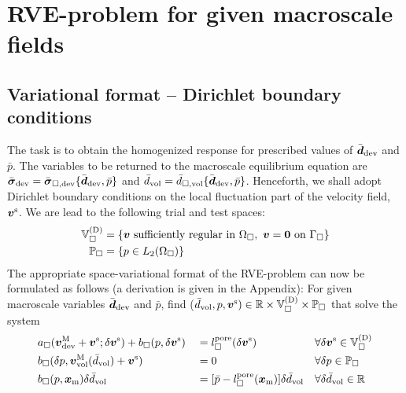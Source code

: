 \documentclass[10pt,a4paper]{article}
\newcommand{\pore}{\mathrm{pore}}
\begin{document}
\section{RVE-problem for given macroscale fields}\label{sec:rve_problem}


\subsection{Variational format -- Dirichlet boundary conditions}

The task is to obtain the homogenized response for prescribed values of $\bar{\boldsymbol{d}}_{\mathrm{dev}}$ and $\bar{p}$. The variables to be returned to the macroscale equilibrium equation are $\bar{\boldsymbol{\sigma}}_{\mathrm{dev}}=\bar{\boldsymbol{\sigma}}_{\Box,\mathrm{dev}}\{\bar{\boldsymbol{d}}_{\mathrm{dev}},\bar{p}\}$ and $\bar{d}_{\mathrm{vol}}=\bar{d}_{\Box,\mathrm{vol}}\{\bar{\boldsymbol{d}}_{\mathrm{dev}}, \bar{p}\}$. Henceforth, we shall adopt Dirichlet boundary conditions on the local fluctuation part of the velocity field, $\boldsymbol{v}^{\mathrm{s}}$. We are lead to the following trial and test spaces:
\begin{align}
    \mathbb{V}_\Box^{(\mathrm{D})} &= \{\boldsymbol{v} \mbox{ sufficiently regular in } \Omega_\Box, \,\, \boldsymbol{v}=\boldsymbol{0}\,\,\mbox{on}\,\,\Gamma_\Box\}
\label{eq:rve_functions_v}\\
    \mathbb{P}_\Box &= \{p\in L_2(\Omega_\Box)\}
\label{eq:rve_functions_p}
\end{align}
The appropriate space-variational format of the RVE-problem can now be formulated as follows (a derivation is given in the Appendix): For given macroscale variables $\bar{\boldsymbol{d}}_{\mathrm{dev}}$ and $\bar{p}$,
find ($\bar{d}_{\mathrm{vol}},p,\boldsymbol{v}^{\mathrm{s}})\in\mathbb{R}\times\mathbb{V}_\Box^{(\mathrm{D})}\times\mathbb{P}_\Box$ that solve the system
\begin{align}
    \label{eq213a} & a_\Box(\ta{v}^\macro_\dev + \ta{v}^\fluct;\delta \ta{v}^\fluct) +  b_\Box(p,\delta\ta{v}^\fluct)
    && =
    l^\pore_\Box(\delta \ta{v}^\fluct)
    && \forall \delta \ta{v}^\fluct\in\set{V}_\Box^{(\Dirichlet)}
 \\
    \label{eq213b} & b_\Box(\delta p, \ta{v}^\macro_\vol(\bar{d}_\vol)+\ta{v}^\fluct)
    && =
    0
    && \forall \delta p\in\set{P}_\Box
\\
    \label{eq213c} & b_\Box(p,\ta{x}_\mean)\delta\bar{d}_\vol
    && =
    [\bar{p} - l_\Box^\pore(\ta{x}_\mean)]\delta\bar{d}_\vol
    && \forall \delta\bar{d}_\vol  \in \set{R}
\end{align}
\end{document}
